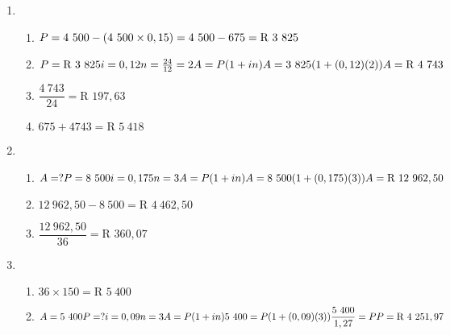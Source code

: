 \begin{solutions}{}{
  \begin{enumerate}[itemsep=5pt, label=\textbf{\arabic*}. ] 
  \item
    \begin{enumerate}[itemsep=4pt, label=\textbf{(\alph*)} ]
    \item  $P=4~500 - (4~500 \times 0,15) \\
      = 4~500 - 675 \\
      = \mbox{R }3~825$
    \item $P = \mbox{R }3~825\\
      i=0,12\\
      n=\frac{24}{12}=2\\
      A=P(1 + in)\\
      A = 3~825(1 + (0,12)(2))\\
      A=\mbox{R }4~743$
    \item $\dfrac{4~743}{24} = \mbox{R }197,63$
    \item $675 + 4743 = \mbox{R }5~418$
    \end{enumerate}
  \item
    \begin{enumerate}[itemsep=4pt, label=\textbf{(\alph*)} ]
    \item $A=?\\
      P = 8~500\\
      i=0,175\\
      n=3\\
      A=P(1 + in)\\
      A = 8~500(1 + (0,175)(3))\\
      A=\mbox{R }12~962,50$
    \item $12~962,50-8~500=\mbox{R }4~462,50$
    \item $\dfrac{12~962,50}{36}=\mbox{R }360,07$
    \end{enumerate}
  \item
    \begin{enumerate}[itemsep=4pt, label=\textbf{(\alph*)} ]
    \item $36 \times 150 = \mbox{R }5~400$
    \item $A=5~400\\
      P = ?\\
      i=0,09\\
      n=3\\
      A=P(1 + in)\\
      5~400 = P(1 + (0,09)(3))\\[4pt]
      \dfrac{5~400}{1,27} = P\\[4pt]
      P=\mbox{R }4~251,97$
    \end{enumerate}
  \end{enumerate}
}
\end{solutions}


